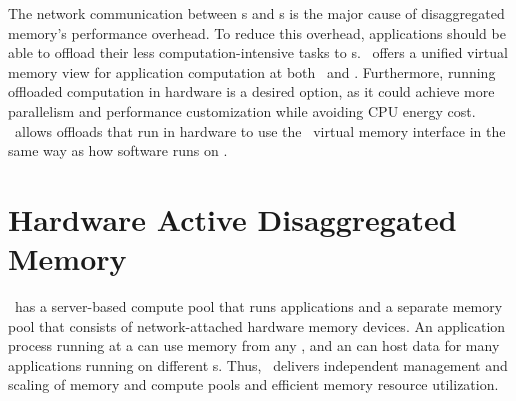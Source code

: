 The network communication between \CN{}s and \MN{}s is the major cause of disaggregated memory's performance overhead.
To reduce this overhead, applications should be able to offload their less computation-intensive tasks to \MN{}s.
\sys\ offers a unified virtual memory view for application computation at both \CN\ and \MN.
Furthermore, running offloaded computation in hardware is a desired option, %
as it could achieve more parallelism and performance customization while avoiding CPU energy cost.
\sys\ allows offloads that run in hardware to use the \sys\ virtual memory interface in the same way as how software runs on \sys.




\section{Hardware Active Disaggregated Memory}
\label{sec:phdm}



\phdm\ has a server-based compute pool that runs applications
and a separate memory pool that consists of network-attached hardware memory devices.
An application process running at a \CN{} can use memory from any \MN{},
and an \MN{} can host data for many applications running on different \CN{}s.
Thus, \phdm\ delivers independent management and scaling of memory and compute pools 
and efficient memory resource utilization.

